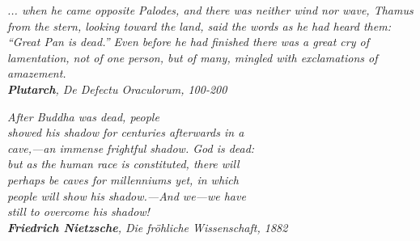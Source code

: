\begingroup
{}
\let\clearpage\relax
\let\cleardoublepage\relax
\let\cleardoublepage\relax

\vspace*{\fill}
\begin{flushright}{\slshape
... when he came opposite Palodes, and there was neither wind nor wave, Thamus from the stern, looking toward the land, said the words as he had heard them: ``Great Pan is dead.'' Even before he had finished there was a great cry of lamentation, not of one person, but of many, mingled with exclamations of amazement. \\
\textbf{Plutarch}, \textit{De Defectu Oraculorum}, 100-200}
\end{flushright}
\begin{flushright}{\slshape
After Buddha was dead, people\\
showed his shadow for centuries afterwards in a \\
cave,—an immense frightful shadow. God is dead:\\
but as the human race is constituted, there will\\
perhaps be caves for millenniums yet, in which\\
people will show his shadow.—And we—we have\\
still to overcome his shadow!\\
\textbf{Friedrich Nietzsche}, \textit{Die fr\"{o}hliche Wissenschaft}, 1882}
\end{flushright}
\vspace*{\fill}
\endgroup
